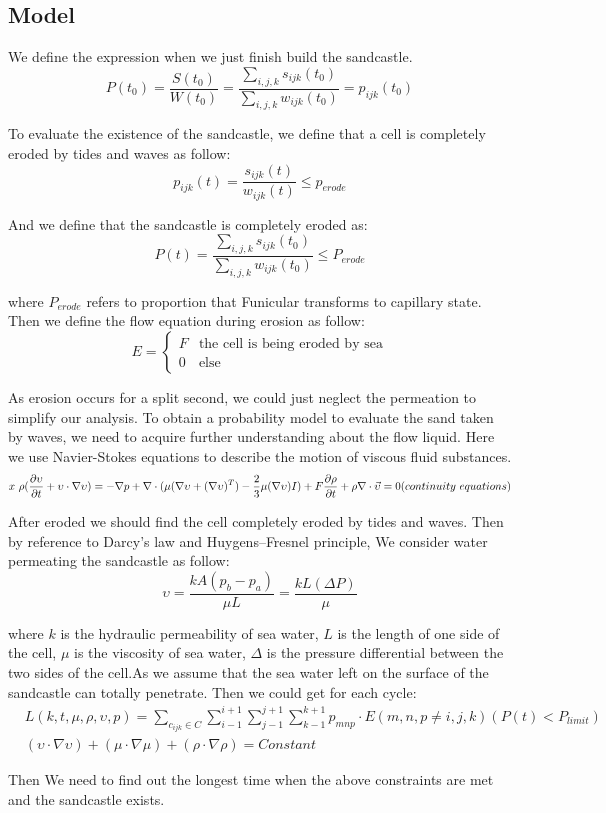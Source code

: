 \documentclass[12pt]{article}
\begin{document}
\subsection{Model}
We define the expression when we just finish build the sandcastle.
$$  P(t_0) = \frac{S(t_0)}{W(t_0)} = \frac{\sum_{i,j,k}s_{ijk}(t_0)}{\sum_{i,j,k}w_{ijk}(t_0)} = p_{ijk}(t_0) $$
\par
To evaluate the existence of the sandcastle, we define that a cell is completely eroded by tides and waves as follow:
$$  p_{ijk}(t) = \frac{s_{ijk}(t)}{w_{ijk}(t)} \leq p_{erode} $$
\par
And we define that the sandcastle is completely eroded as:
$$  P(t) = \frac{\sum_{i,j,k}s_{ijk}(t_0)}{\sum_{i,j,k}w_{ijk}(t_0)} \leq P_{erode} $$
\par
where $P_{erode}$ refers to proportion that Funicular transforms to capillary state. Then we define the flow equation during erosion as follow:
$$	E=
    \begin{cases}
        F & \text{the cell is being eroded by sea} \\
        0 & \text{else}
    \end{cases}
$$
\par
As erosion occurs for a split second, we could just neglect the permeation to simplify our analysis. To obtain a probability model to evaluate the sand taken by waves, we need to acquire further understanding about the flow liquid. Here we use Navier-Stokes equations to describe the motion of viscous fluid substances.
$$
    x \rho(\frac{\partial \upsilon}{\partial t} + \upsilon \cdot \nabla \upsilon) = -\nabla p + \nabla \cdot(\mu(\nabla \upsilon+(\nabla \upsilon)^T)-\frac{2}{3}\mu(\nabla \upsilon)I)+F\\\frac{\partial \rho}{\partial t}+\rho\nabla\cdot\vec{\upsilon}=0(continuity \ equations)
$$
\par
After eroded we should find the cell completely eroded by tides and waves. Then by reference to Darcy's law and Huygens–Fresnel principle, We consider water permeating the sandcastle as follow:
$$
    \upsilon=\frac{kA(p_b-p_a)}{\mu L}=\frac{kL(\Delta P)}{\mu}
$$
\par
where $k$ is the hydraulic permeability of sea water, $L$ is the length of one side of the cell, $\mu$ is the viscosity of sea water, $\Delta$ is the pressure differential between the two sides of the cell.As we assume that the sea water left on the surface of the sandcastle can totally penetrate. Then we could get for each cycle:
\begin{align*}
     & L (k,t,\mu,\rho,\upsilon,p)=\sum_{c_{ijk}\in C}\sum_{i-1}^{i+1}\sum_{j-1}^{j+1}\sum_{k-1}^{k+1}{p_{mnp}\cdot E}(m,n,p \neq i,j,k)(P(t) <P_{limit}) \\
     & (\upsilon \cdot \nabla \upsilon)+(\mu \cdot \nabla \mu)+(\rho \cdot \nabla \rho) = Constant
\end{align*}
\par
Then We need to find out the longest time when the above constraints are met and the sandcastle exists.
\end{document}
